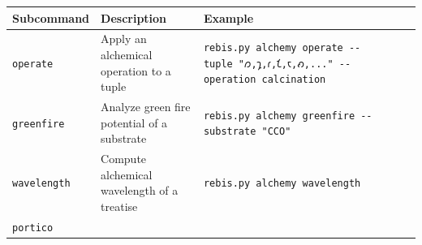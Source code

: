 \begin{longtable}[]{@{}lll@{}}
\toprule
\begin{minipage}[b]{0.32\columnwidth}\raggedright
Subcommand\strut
\end{minipage} & \begin{minipage}[b]{0.35\columnwidth}\raggedright
Description\strut
\end{minipage} & \begin{minipage}[b]{0.24\columnwidth}\raggedright
Example\strut
\end{minipage}\tabularnewline
\midrule
\endhead
\begin{minipage}[t]{0.32\columnwidth}\raggedright
\texttt{operate}\strut
\end{minipage} & \begin{minipage}[t]{0.35\columnwidth}\raggedright
Apply an alchemical operation to a tuple\strut
\end{minipage} & \begin{minipage}[t]{0.24\columnwidth}\raggedright
\texttt{rebis.py\ alchemy\ operate\ -\/-tuple\ "𐑼,𐑡,𐑩,𐑗,𐑱,𐑺,..."\ -\/-operation\ calcination}\strut
\end{minipage}\tabularnewline
\begin{minipage}[t]{0.32\columnwidth}\raggedright
\texttt{greenfire}\strut
\end{minipage} & \begin{minipage}[t]{0.35\columnwidth}\raggedright
Analyze green fire potential of a substrate\strut
\end{minipage} & \begin{minipage}[t]{0.24\columnwidth}\raggedright
\texttt{rebis.py\ alchemy\ greenfire\ -\/-substrate\ "CCO"}\strut
\end{minipage}\tabularnewline
\begin{minipage}[t]{0.32\columnwidth}\raggedright
\texttt{wavelength}\strut
\end{minipage} & \begin{minipage}[t]{0.35\columnwidth}\raggedright
Compute alchemical wavelength of a treatise\strut
\end{minipage} & \begin{minipage}[t]{0.24\columnwidth}\raggedright
\texttt{rebis.py\ alchemy\ wavelength}\strut
\end{minipage}\tabularnewline
\begin{minipage}[t]{0.32\columnwidth}\raggedright
\texttt{portico}\strut
\end{minipage} & \begin{minipage}[t]{0.35\columnwidth}\raggedright

\end{minipage}
\end{longtable}
